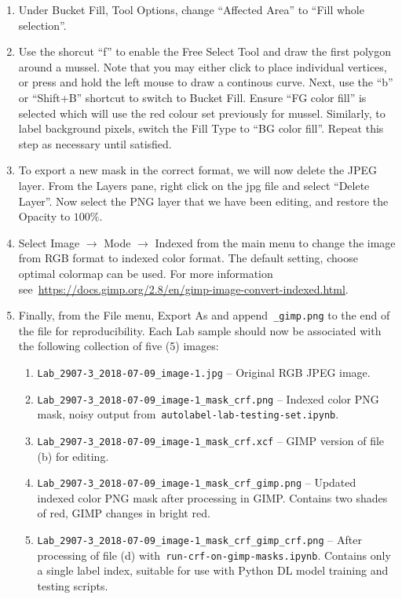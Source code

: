 \documentclass[11pt]{article} %
\begin{document}
\begin{enumerate}
\item Under Bucket Fill, Tool Options, change ``Affected Area'' to ``Fill whole 
selection''.

\item Use the shorcut ``f'' to enable the Free Select Tool and draw the first 
polygon around a mussel. Note that you may either click to place individual
vertices, or press and hold the left mouse to draw a continous curve. Next, use
the ``b'' or ``Shift+B'' shortcut to switch to Bucket Fill. Ensure ``FG color
fill'' is selected which will use the red colour set previously for mussel. 
Similarly, to label background pixels, switch the Fill Type to ``BG color 
fill''. Repeat this step as necessary until satisfied.

\item To export a new mask in the correct format, we will now delete the JPEG 
layer. From the Layers pane, right click on the jpg file and select ``Delete
Layer''. Now select the PNG layer that we have been editing, and restore the 
Opacity to $100\%$. 

\item Select Image $\rightarrow$ Mode $\rightarrow$ Indexed from the 
main menu to change the image from RGB format to indexed color 
format. The default setting, choose optimal colormap can be 
used. For more information 
see~\url{https://docs.gimp.org/2.8/en/gimp-image-convert-indexed.html}.

\item Finally, from the File menu, Export As and append~\texttt{\_gimp.png} to 
the end of the file for reproducibility. Each Lab sample should now be 
associated with the following collection of five (5) images:

\begin{enumerate}
\item \texttt{Lab\_2907-3\_2018-07-09\_image-1.jpg} -- Original RGB JPEG image.
\item \texttt{Lab\_2907-3\_2018-07-09\_image-1\_mask\_crf.png} -- Indexed color 
PNG mask, noisy output from~\texttt{autolabel-lab-testing-set.ipynb}.
\item \texttt{Lab\_2907-3\_2018-07-09\_image-1\_mask\_crf.xcf} -- GIMP version 
of file (b) for editing.
\item \texttt{Lab\_2907-3\_2018-07-09\_image-1\_mask\_crf\_gimp.png} -- Updated 
indexed color PNG mask after processing in GIMP. Contains two shades of red, 
GIMP changes in bright red.
\item \texttt{Lab\_2907-3\_2018-07-09\_image-1\_mask\_crf\_gimp\_crf.png} -- 
After processing of file (d) with~\texttt{run-crf-on-gimp-masks.ipynb}. Contains
only a single label index, suitable for use with Python DL model training and
testing scripts.

\end{enumerate}

\end{enumerate}
\end{document}
